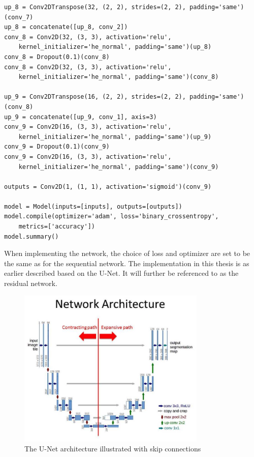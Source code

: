 \documentclass[USenglish]{ifimaster}  %
\begin{document}
\begin{verbatim}
up_8 = Conv2DTranspose(32, (2, 2), strides=(2, 2), padding='same')(conv_7)
up_8 = concatenate([up_8, conv_2])
conv_8 = Conv2D(32, (3, 3), activation='relu', 
    kernel_initializer='he_normal', padding='same')(up_8)
conv_8 = Dropout(0.1)(conv_8)
conv_8 = Conv2D(32, (3, 3), activation='relu', 
    kernel_initializer='he_normal', padding='same')(conv_8)

up_9 = Conv2DTranspose(16, (2, 2), strides=(2, 2), padding='same')(conv_8)
up_9 = concatenate([up_9, conv_1], axis=3)
conv_9 = Conv2D(16, (3, 3), activation='relu', 
    kernel_initializer='he_normal', padding='same')(up_9)
conv_9 = Dropout(0.1)(conv_9)
conv_9 = Conv2D(16, (3, 3), activation='relu', 
    kernel_initializer='he_normal', padding='same')(conv_9)

outputs = Conv2D(1, (1, 1), activation='sigmoid')(conv_9)

model = Model(inputs=[inputs], outputs=[outputs])
model.compile(optimizer='adam', loss='binary_crossentropy', 
    metrics=['accuracy'])
model.summary()

\end{verbatim}

When implementing the network, the choice of loss and optimizer are set to be the same as for the sequential network. The implementation in this thesis is as earlier described based on the U-Net. It will further be referenced to as the residual network.

\begin{figure}[ht]
    \centering
    \includegraphics[width=0.8\textwidth]{bilder/u-net_architecture_method.png}
    \caption{The U-Net architecture illustrated with skip connections \cite{website:u-net_method}}
    \label{fig:u_net_method_chapter}
\end{figure}
\end{document}
